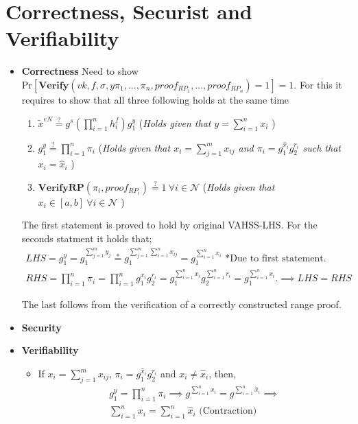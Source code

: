 \section*{Correctness, Securist and Verifiability}
\begin{itemize}
    \item \textbf{Correctness} Need to show $\text{Pr}[\textbf{Verify}(vk,f,\sigma,y\pi_1,...,\pi_n,proof_{RP_1},...,proof_{RP_n}) = 1] = 1$. For this it requires to show that all three following holds at the same time
    \begin{enumerate}
        \item $\tilde{x}^{eN} \overset{?}{=} g^s (\prod_{i=1}^n h_i^f )g_1^y$ \quad \quad (\textit{Holds given that} $y=\sum_{i=1}^n x_i$ ) 
        \item $g_1^y \overset{?}{=} \prod_{i=1}^n \pi_i$ \quad \quad (\textit{Holds given that $x_i=\sum_{j=1}^m x_{ij}$ and $\pi_i = g_1^{\hat{x}_i}g_2^{r_i}$ such that $x_i = \hat{x}_i$} ) 
        \item $\textbf{VerifyRP}(\pi_i,proof_{RP_i})\overset{?}{=}1 \: \forall i\in\mathcal{N}$ (\textit{Holds given that $x_i\in [a,b]\: \forall i\in\mathcal{N}$} ) 
    \end{enumerate}  
    The first statement is proved to hold by original VAHSS-LHS. For the seconds statment it holds that;
    \begin{align*}
        LHS = g_1^y = g_1^{\sum_{j=1}^m y_{j}} \overset{*}{=} g_1^{\sum_{j=1}^m \sum_{i=1}^n x_{ij}}
 = g_1^{\sum_{i=1}^n x_{i}} \text{ *Due to first statement.} \\
 RHS = \prod_{i=1}^n \pi_i = \prod_{i=1}^n g_1^{x_i}g_2^{r_i} = g_1^{\sum_{i=1}^n x_i} g_2 ^{\sum_{i=1}^n r_i} =  g_1^{\sum_{i=1}^n x_i}.  \implies LHS = RHS
 \end{align*} 
 
 The last follows from the verification of a correctly constructed range proof.
 
 \item\textbf{Security} 
 
 \item \textbf{Verifiability}
    \begin{itemize}
        \item If $x_i=\sum_{j=1}^m x_{ij}$,  $\pi_i = g_1^{\hat{x}_i}g_2^{r_i}$  and  $x_i \neq \hat{x}_i$, then,
        \begin{align*}
            g_1^y = \prod_{i=1}^n \pi_i \implies
            g^{\sum_{i=1}^n x_{i}} =  g^{\sum_{i=1}^n \hat{x}_{i}} \implies \\
            \sum_{i=1}^n x_{i} = \sum_{i=1}^n \hat{x}_{i} \text{ (Contraction)}
        \end{align*}
    \end{itemize}
\end{itemize}
